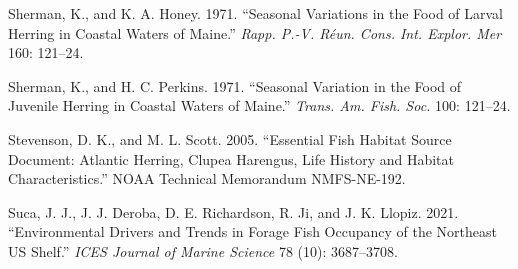 \documentclass[
  letterpaper,
  DIV=11,
  numbers=noendperiod]{scrartcl}
\newlength{\cslhangindent}
\newenvironment{CSLReferences}[2] %
 {\begin{list}{}{%
  \setlength{\itemindent}{0pt}
  \setlength{\leftmargin}{0pt}
  \setlength{\parsep}{0pt}
  \ifodd #1
   \setlength{\leftmargin}{\cslhangindent}
   \setlength{\itemindent}{-1\cslhangindent}
  \fi
  \setlength{\itemsep}{#2\baselineskip}}}
 {\end{list}}
\begin{document}
\begin{CSLReferences}{1}{0}
Sherman, K., and K. A. Honey. 1971. {``Seasonal Variations in the Food
of Larval Herring in Coastal Waters of Maine.''} \emph{Rapp. P.-V. Réun.
Cons. Int. Explor. Mer} 160: 121--24.

Sherman, K., and H. C. Perkins. 1971. {``Seasonal Variation in the Food
of Juvenile Herring in Coastal Waters of Maine.''} \emph{Trans. Am.
Fish. Soc.} 100: 121--24.

Stevenson, D. K., and M. L. Scott. 2005. {``Essential Fish Habitat
Source Document: Atlantic Herring, Clupea Harengus, Life History and
Habitat Characteristics.''} NOAA Technical Memorandum NMFS-NE-192.

Suca, J. J., J. J. Deroba, D. E. Richardson, R. Ji, and J. K. Llopiz.
2021. {``Environmental Drivers and Trends in Forage Fish Occupancy of
the Northeast US Shelf.''} \emph{ICES Journal of Marine Science} 78
(10): 3687--3708.

\end{CSLReferences}
\end{document}
